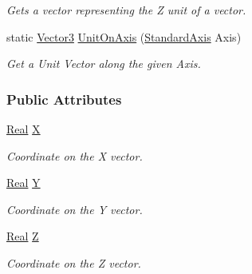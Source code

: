 \begin{DoxyCompactItemize}
\begin{DoxyCompactList}\small\item\em Gets a vector representing the Z unit of a vector. \item\end{DoxyCompactList}\item 
static \hyperlink{classMezzanine_1_1Vector3}{Vector3} \hyperlink{classMezzanine_1_1Vector3_a3692a8fd777e4a30150b570d3fcba346}{UnitOnAxis} (\hyperlink{namespaceMezzanine_ab41a00a8c6a47b576dc987ec34e16ba1}{StandardAxis} Axis)
\begin{DoxyCompactList}\small\item\em Get a Unit Vector along the given Axis. \item\end{DoxyCompactList}\end{DoxyCompactItemize}
\subsubsection*{Public Attributes}
\begin{DoxyCompactItemize}
\item 
\hypertarget{classMezzanine_1_1Vector3_aa858d9bc5ac5ad1b685b7088c94c05f6}{
\hyperlink{namespaceMezzanine_a726731b1a7df72bf3583e4a97282c6f6}{Real} \hyperlink{classMezzanine_1_1Vector3_aa858d9bc5ac5ad1b685b7088c94c05f6}{X}}
\label{classMezzanine_1_1Vector3_aa858d9bc5ac5ad1b685b7088c94c05f6}

\begin{DoxyCompactList}\small\item\em Coordinate on the X vector. \item\end{DoxyCompactList}\item 
\hypertarget{classMezzanine_1_1Vector3_a2303527e4ea4cd1659a23320627cd62c}{
\hyperlink{namespaceMezzanine_a726731b1a7df72bf3583e4a97282c6f6}{Real} \hyperlink{classMezzanine_1_1Vector3_a2303527e4ea4cd1659a23320627cd62c}{Y}}
\label{classMezzanine_1_1Vector3_a2303527e4ea4cd1659a23320627cd62c}

\begin{DoxyCompactList}\small\item\em Coordinate on the Y vector. \item\end{DoxyCompactList}\item 
\hypertarget{classMezzanine_1_1Vector3_a9b887faced986921956f20f3e4cb8ddc}{
\hyperlink{namespaceMezzanine_a726731b1a7df72bf3583e4a97282c6f6}{Real} \hyperlink{classMezzanine_1_1Vector3_a9b887faced986921956f20f3e4cb8ddc}{Z}}
\label{classMezzanine_1_1Vector3_a9b887faced986921956f20f3e4cb8ddc}

\begin{DoxyCompactList}\small\item\em Coordinate on the Z vector. \item\end{DoxyCompactList}\end{DoxyCompactItemize}


